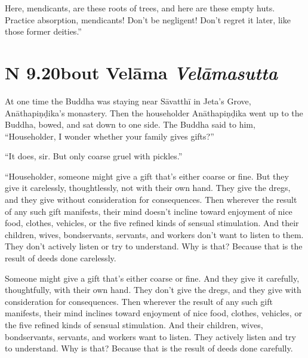 \documentclass[12pt,openany]{book}%
\newcommand*{\suttatitleacronym}[1]{\smaller[2]{#1}\vspace*{.3em}}
\newcommand*{\suttatitletranslation}[1]{\linebreak{#1}}
\newcommand*{\suttatitleroot}[1]{\linebreak\smaller[2]\itshape{#1}}
\newcommand*{\tocacronym}[1]{\hspace*{-3.3em}{#1}\quad}
\newcommand*{\toctranslation}[1]{#1}
\newcommand*{\tocroot}[1]{(\textit{#1})}
\begin{document}
Here, mendicants, are these roots of trees, and here are these empty huts. Practice absorption, mendicants! Don’t be negligent! Don’t regret it later, like those former deities.” 

%
\section*{{\suttatitleacronym AN 9.20}{\suttatitletranslation About Velāma }{\suttatitleroot Velāmasutta}}
\addcontentsline{toc}{section}{\tocacronym{AN 9.20} \toctranslation{About Velāma } \tocroot{Velāmasutta}}

At one time the Buddha was staying near \textsanskrit{Sāvatthī} in Jeta’s Grove, \textsanskrit{Anāthapiṇḍika}’s monastery. Then the householder \textsanskrit{Anāthapiṇḍika} went up to the Buddha, bowed, and sat down to one side. The Buddha said to him, “Householder, I wonder whether your family gives gifts?” 

“It does, sir. But only coarse gruel with pickles.” 

“Householder, someone might give a gift that’s either coarse or fine. But they give it carelessly, thoughtlessly, not with their own hand. They give the dregs, and they give without consideration for consequences. Then wherever the result of any such gift manifests, their mind doesn’t incline toward enjoyment of nice food, clothes, vehicles, or the five refined kinds of sensual stimulation. And their children, wives, bondservants, servants, and workers don’t want to listen to them. They don’t actively listen or try to understand. Why is that? Because that is the result of deeds done carelessly. 

Someone might give a gift that’s either coarse or fine. And they give it carefully, thoughtfully, with their own hand. They don’t give the dregs, and they give with consideration for consequences. Then wherever the result of any such gift manifests, their mind inclines toward enjoyment of nice food, clothes, vehicles, or the five refined kinds of sensual stimulation. And their children, wives, bondservants, servants, and workers want to listen. They actively listen and try to understand. Why is that? Because that is the result of deeds done carefully. 
\end{document}
